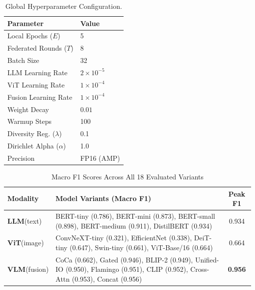 \documentclass[letterpaper, conference]{IEEEtran}
\begin{document}
\begin{table}[t]
\caption{Global Hyperparameter Configuration.}
\label{tab:hyper}
\centering\footnotesize
\begin{tabular}{ll}
\toprule
\textbf{Parameter} & \textbf{Value} \\
\midrule
Local Epochs ($E$) & 5 \\
Federated Rounds ($T$) & 8 \\
Batch Size & 32 \\
LLM Learning Rate & $2 \times 10^{-5}$ \\
ViT Learning Rate & $1 \times 10^{-4}$ \\
Fusion Learning Rate & $1 \times 10^{-4}$ \\
Weight Decay & $0.01$ \\
Warmup Steps & 100 \\
Diversity Reg. ($\lambda$) & 0.1 \\
Dirichlet Alpha ($\alpha$) & 1.0 \\
Precision & FP16 (AMP) \\
\bottomrule
\end{tabular}
\end{table}

\begin{table}[t]
\caption{Macro F1 Scores Across All 18 Evaluated Variants}
\label{tab:performance_variants}
\centering
\footnotesize
\renewcommand{\arraystretch}{1.05}
\begin{tabular}{>{\raggedright\arraybackslash}p{1.4cm} >{\raggedright\arraybackslash}p{5.2cm} c}
\toprule
\textbf{Modality} & \textbf{Model Variants (Macro F1)} & \textbf{Peak F1} \\
\midrule
\textbf{LLM}\newline(text) & BERT-tiny (0.786), BERT-mini (0.873), BERT-small (0.898), BERT-medium (0.911), DistilBERT (0.934) & 0.934 \\
\midrule
\textbf{ViT}\newline(image) & ConvNeXT-tiny (0.321), EfficientNet (0.338), DeiT-tiny (0.647), Swin-tiny (0.661), ViT-Base/16 (0.664) & 0.664 \\
\midrule
\textbf{VLM}\newline(fusion) & CoCa (0.662), Gated (0.946), BLIP-2 (0.949), Unified-IO (0.950), Flamingo (0.951), CLIP (0.952), Cross-Attn (0.953), Concat (0.956) & \textbf{0.956} \\
\bottomrule
\end{tabular}
\end{table}
\end{document}
